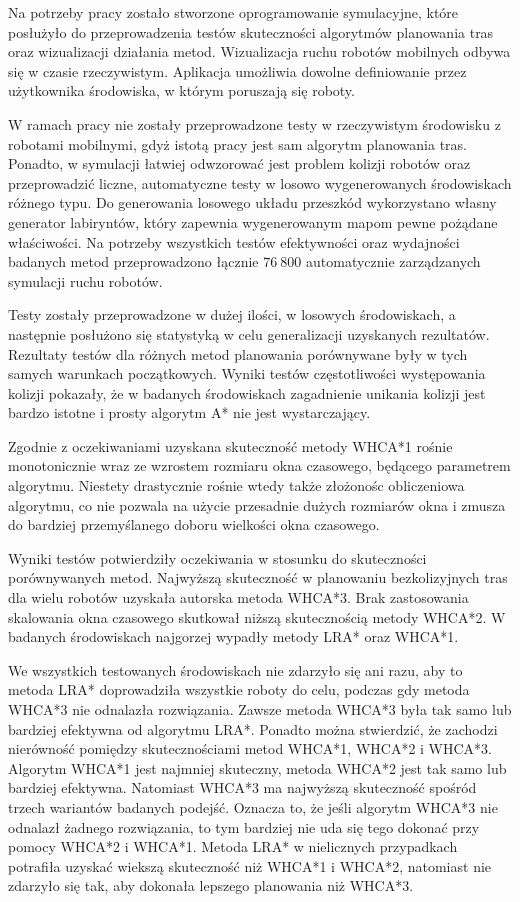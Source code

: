 Na potrzeby pracy zostało stworzone oprogramowanie symulacyjne, które posłużyło do przeprowadzenia testów skuteczności algorytmów planowania tras oraz wizualizacji działania metod.
Wizualizacja ruchu robotów mobilnych odbywa się w czasie rzeczywistym.
Aplikacja umożliwia dowolne definiowanie przez użytkownika środowiska, w którym poruszają się roboty.

W ramach pracy nie zostały przeprowadzone testy w rzeczywistym środowisku z robotami mobilnymi, gdyż istotą pracy jest sam algorytm planowania tras.
Ponadto, w symulacji łatwiej odwzorować jest problem kolizji robotów oraz przeprowadzić liczne, automatyczne testy w losowo wygenerowanych środowiskach różnego typu.
Do generowania losowego układu przeszkód wykorzystano własny generator labiryntów, który zapewnia wygenerowanym mapom pewne pożądane właściwości.
Na potrzeby wszystkich testów efektywności oraz wydajności badanych metod przeprowadzono łącznie $76\ 800$ automatycznie zarządzanych symulacji ruchu robotów.

Testy zostały przeprowadzone w dużej ilości, w losowych środowiskach, a następnie posłużono się statystyką w celu generalizacji uzyskanych rezultatów.
Rezultaty testów dla różnych metod planowania porównywane były w tych samych warunkach początkowych.
Wyniki testów częstotliwości występowania kolizji pokazały, że w badanych środowiskach zagadnienie unikania kolizji jest bardzo istotne i prosty algorytm A* nie jest wystarczający.

Zgodnie z oczekiwaniami uzyskana skuteczność metody WHCA*1 rośnie monotonicznie wraz ze wzrostem rozmiaru okna czasowego, będącego parametrem algorytmu.
Niestety drastycznie rośnie wtedy także złożonośc obliczeniowa algorytmu, co nie pozwala na użycie przesadnie dużych rozmiarów okna i zmusza do bardziej przemyślanego doboru wielkości okna czasowego.

Wyniki testów potwierdziły oczekiwania w stosunku do skuteczności porównywanych metod.
Najwyższą skuteczność w planowaniu bezkolizyjnych tras dla wielu robotów uzyskała autorska metoda WHCA*3.
Brak zastosowania skalowania okna czasowego skutkował niższą skutecznością metody WHCA*2.
W badanych środowiskach najgorzej wypadły metody LRA* oraz WHCA*1.

We wszystkich testowanych środowiskach nie zdarzyło się ani razu, aby to metoda LRA* doprowadziła wszystkie roboty do celu, podczas gdy metoda WHCA*3 nie odnalazła rozwiązania.
Zawsze metoda WHCA*3 była tak samo lub bardziej efektywna od algorytmu LRA*.
Ponadto można stwierdzić, że zachodzi nierówność pomiędzy skutecznościami metod WHCA*1, WHCA*2 i WHCA*3.
Algorytm WHCA*1 jest najmniej skuteczny, metoda WHCA*2 jest tak samo lub bardziej efektywna. Natomiast WHCA*3 ma najwyższą skuteczność spośród trzech wariantów badanych podejść.
Oznacza to, że jeśli algorytm WHCA*3 nie odnalazł żadnego rozwiązania, to tym bardziej nie uda się tego dokonać przy pomocy WHCA*2 i WHCA*1.
Metoda LRA* w nielicznych przypadkach potrafiła uzyskać wiekszą skuteczność niż WHCA*1 i WHCA*2, natomiast nie zdarzyło się tak, aby dokonała lepszego planowania niż WHCA*3.

